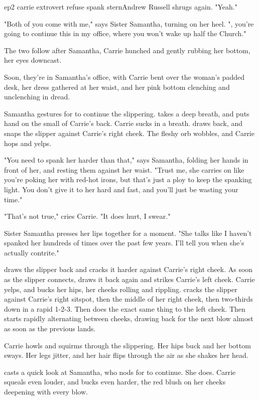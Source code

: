 \documentclass{book}
\begin{document}
\begin{childnode}{ep2 carrie extrovert refuse spank stern}{Andrew Russell}
    \name{} shrugs again. "Yeah." 

    "Both of you come with me," says Sister Samantha, turning on her heel. "\name{}, you're going to continue this in my office, where you won't wake up half the Church."

    The two follow after Samantha, Carrie hunched and gently rubbing her bottom, her eyes downcast.

    Soon, they're in Samantha's office, with Carrie bent over the woman's padded desk, her dress gathered at her waist, and her pink bottom clenching and unclenching in dread.

    Samantha gestures for \name{} to continue the slippering. \name{} takes a deep breath, and puts \hisher{} hand on the small of Carrie's back. Carrie sucks in a breath. \name{} draws back, and snaps the slipper against Carrie's right cheek. The fleshy orb wobbles,
    and Carrie hops and yelps.

    "You need to spank her harder than that," says Samantha, folding her hands in front of her, and resting them against her waist. "Trust me, she carries on like you're poking her with red-hot 
    irons, but that's just a ploy to keep the spanking light. You don't give it to her hard and
    fast, and you'll just be wasting your time."

    "That's not true," cries Carrie. "It does hurt, I swear."

    Sister Samantha presses her lips together for a moment. "She talks like I haven't spanked her hundreds of times over the past few years. I'll tell you when she's actually contrite."

    \name{} draws the slipper back and cracks it harder against Carrie's right cheek. As soon as the slipper connects, \name{} draws it back again and strikes Carrie's left cheek. Carrie yelps, and bucks her hips, her cheeks rolling and rippling. \name{} cracks
    the slipper against Carrie's right sitspot, then the middle of her right cheek, then two-thirds down in a rapid 1-2-3. Then \heshe{} does the exact same thing to the left cheek. Then \heshe{} starts rapidly alternating between cheeks, drawing back for the next
    blow almost as soon as the previous lands.

    Carrie howls and squirms through the slippering. Her hips buck and her bottom sways. Her legs jitter, and her hair flips through the air as she shakes her head.

    \name{} casts a quick look at Samantha, who nods for \himher{} to continue. She does. Carrie squeals even louder, and bucks even harder, the red blush on her cheeks deepening
    with every blow.


\end{childnode}
\end{document}
